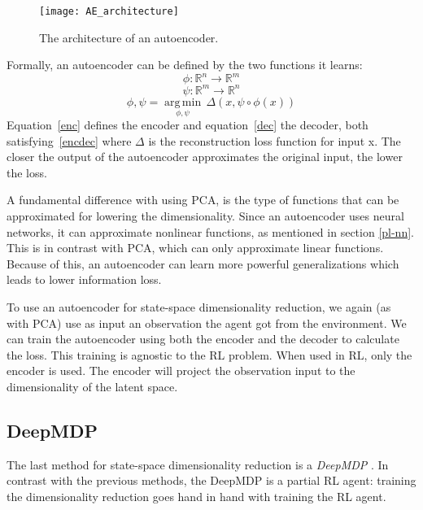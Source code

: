 \begin{figure}[h]
    \centering
    \texttt{[image: AE\_architecture]}
    \caption{The architecture of an autoencoder.}
    \label{fig:AE_architecture}
\end{figure}

Formally, an autoencoder can be defined by the two functions it learns: 
\begin{equation}
  \label{enc}
  \phi :{\mathbb{R}^n}\rightarrow {\mathbb{R}^m}
\end{equation}
\begin{equation}
  \label{dec}
  \psi :{\mathbb{R}^m}\rightarrow {\mathbb{R}^n}
\end{equation}
\begin{equation}
  \label{encdec}
  \phi ,\psi ={\underset {\phi ,\psi }{\operatorname {arg\,min} }}\,{\Delta}(x, \psi \circ \phi (x))
\end{equation}
Equation~\eqref{enc} defines the encoder and equation~\eqref{dec} the decoder, both satisfying~\eqref{encdec} where $\Delta$ is the reconstruction loss function for input x. The closer the output of the autoencoder approximates the original input, the lower the loss.

A fundamental difference with using PCA, is the type of functions that can be approximated for lowering the dimensionality. Since an autoencoder uses neural networks, it can approximate nonlinear functions, as mentioned in section \ref{pl-nn}. This is in contrast with PCA, which can only approximate linear functions. Because of this, an autoencoder can learn more powerful generalizations which leads to lower information loss\cite{AE_general}.

To use an autoencoder for state-space dimensionality reduction, we again (as with PCA) use as input an observation the agent got from the environment. We can train the autoencoder using both the encoder and the decoder to calculate the loss. This training is agnostic to the RL problem. When used in RL, only the encoder is used. The encoder will project the observation input to the dimensionality of the latent space. 

\subsection{DeepMDP}\label{pl-deepmdp}
The last method for state-space dimensionality reduction is a \emph{DeepMDP} \cite{deepmdp}. In contrast with the previous methods, the DeepMDP is a partial RL agent: training the dimensionality reduction goes hand in hand with training the RL agent.

